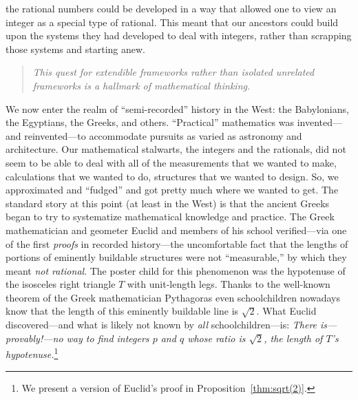 the rational numbers could be developed in a way that allowed one to
view an integer as a special type of rational.  This meant that our
ancestors could build upon the systems they had developed to deal with
integers, rather than scrapping those systems and starting anew.
\begin{quote}
{\em This quest for {\em extendible} frameworks rather than isolated
  unrelated frameworks is a hallmark of mathematical thinking.}
\end{quote}
We now enter the realm of ``semi-recorded'' history in the West: the
Babylonians, the Egyptians, the Greeks, and others.  ``Practical''
mathematics was invented---and reinvented---to accommodate pursuits as
varied as astronomy and architecture.  Our mathematical stalwarts, the
integers and the rationals, did not seem to be able to deal with all
of the measurements that we wanted to make, calculations that we
wanted to do, structures that we wanted to design.  So, we
approximated and ``fudged'' and got pretty much where we wanted to
get.  The standard story at this point (at least in the West) is that
the ancient Greeks began to try to systematize mathematical knowledge
and practice.  The Greek mathematician and geometer Euclid
 and members of his school verified---via one of the
first {\em proofs} in recorded history---the uncomfortable fact that
the lengths of portions of eminently buildable structures were not
``measurable,'' by which they meant {\em not rational}.  The poster
child for this phenomenon was the hypotenuse of the isosceles right
triangle $T$ with unit-length legs.  Thanks to the well-known theorem
of the Greek mathematician Pythagoras  even
schoolchildren nowadays know that the length of this eminently
buildable line is $\sqrt{2}$.  What Euclid discovered---and what is
likely not known by {\em all} schoolchildren---is: {\em There
  is---provably!---no way to find integers $p$ and $q$ whose ratio is
  $\sqrt{2}$, the length of $T$'s hypotenuse.}\footnote{We present a
  version of Euclid's proof in Proposition~\ref{thm:sqrt(2)}.}
